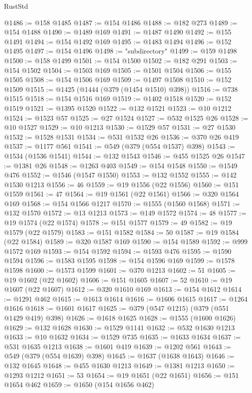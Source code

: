 \begin{lexlean}{RustStd}
\begin{coremodule}
{\begin{coremodule}
{{{{{{{{{{{{{{{{{{{{{{{{{{{{{{{{{{{{{{{{{{{{{{{{{{{{{{{{{{{{{{{{{{{{{{{{{{{{{{{{@1486 := @158 @1485
@1487 := @154 @1486
@1488 := @182 @273
@1489 := @154 @1488
@1490 := @1489 @169
@1491 := @1487 @1490
@1492 := @155 @1491
@1494 := @154 @1492 @169
@1495 := @1483 @1494
@1496 := @152 @1495
@1497 := @154 @1496
@1498 := "subdirectory"
@1499 := @159 @1498
@1500 := @158 @1499
@1501 := @154 @1500
@1502 := @182 @291
@1503 := @154 @1502
@1504 := @1503 @169
@1505 := @1501 @1504
@1506 := @155 @1505
@1508 := @154 @1506 @169
@1509 := @1497 @1508
@1510 := @152 @1509
@1515 := @1425 (@1444 (@379 (@1454 @1510) @398))
@1516 := @738 @1515
@1518 := @154 @1516 @169
@1519 := @1402 @1518
@1520 := @152 @1519
@1521 := @1395 @1520
@1522 := @132 @1521
@1523 := @10 @1212
@1524 := @1523 @57
@1525 := @27 @1524
@1527 := @532 @1525 @26
@1528 := @10 @1527
@1529 := @10 @1213
@1530 := @1529 @57
@1531 := @27 @1530
@1532 := @1528 @1531
@1534 := @531 @1532 @26
@1536 := @370 @26 @419
@1537 := @1177 @561
@1541 := @549 (@379 (@554 @1537) @398)
@1543 := @1534 (@1536 @1541)
@1544 := @132 @1543
@1546 := @455 @1525 @26
@1547 := @1381 @26
@1548 := @1263 @403
@1549 := @154 @1548
@1550 := @1549 @476
@1552 := @1546 (@1547 @1550)
@1553 := @132 @1552
@1555 := @142 @1530 @1213
@1556 := 46
@1559 := @19 @1556 (@22 @1556)
@1560 := @151 @1559
@1561 := 47
@1564 := @19 @1561 (@22 @1561)
@1566 := @320 @1564 @169
@1568 := @154 @1566 @1217
@1570 := @1555 (@1560 @1568)
@1571 := @132 @1570
@1572 := @13 @1213
@1573 := @149 @1572
@1574 := 48
@1577 := @19 @1574 (@22 @1574)
@1578 := @151 @1577
@1579 := 49
@1582 := @19 @1579 (@22 @1579)
@1583 := @151 @1582
@1584 := 50
@1587 := @19 @1584 (@22 @1584)
@1589 := @320 @1587 @169
@1590 := @154 @1589
@1592 := @999 @1572 @169
@1593 := @154 @1592
@1594 := @1593 @476
@1595 := @1590 @1594
@1596 := @1583 @1595
@1598 := @154 @1596 @169
@1599 := @1578 @1598
@1600 := @1573 @1599
@1601 := @370 @1213
@1602 := 51
@1605 := @19 @1602 (@22 @1602)
@1606 := @151 @1605
@1607 := 52
@1610 := @19 @1607 (@22 @1607)
@1612 := @320 @1610 @169
@1613 := @154 @1612
@1614 := @1291 @462
@1615 := @1613 @1614
@1616 := @1606 @1615
@1617 := @1264 @1616
@1618 := @1601 @1617
@1625 := @379 (@547 @1215) (@379 (@551 @1429 @419) @398)
@1626 := @1618 @1625
@1628 := @1555 (@1600 @1626)
@1629 := @132 @1628
@1630 := @1529 @1141
@1632 := @532 @1630 @1213
@1633 := @10 @1632
@1634 := @1529 @735
@1635 := @1633 @1634
@1637 := @531 @1635 @1213
@1638 := @1601 @419
@1639 := @1202 @561
@1643 := @549 (@379 (@554 @1639) @398)
@1645 := @1637 (@1638 @1643)
@1646 := @132 @1645
@1648 := @455 @1630 @1213
@1649 := @1381 @1213
@1650 := @1293 @1212
@1651 := 53
@1654 := @19 @1651 (@22 @1651)
@1656 := @151 @1654 @462
@1659 := @1650 (@154 @1656 @462)
}}}}}}}}}}}}}}}}}}}}}}}}}}}}}}}}}}}}}}}}}}}}}}}}}}}}}}}}}}}}}}}}}}}}}}}}}}}}}}}}
\end{coremodule}}
\end{coremodule}
\end{lexlean}
